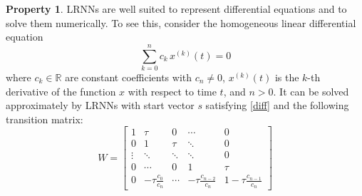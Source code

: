 \documentclass{sn-jnl}
\theoremstyle{definition}
\newtheorem{exmp}{Example}
\newtheorem{prop}{Property}
\begin{document}
\begin{prop}\label{rem}
LRNNs are well suited to represent differential equations and to solve them
numerically. To see this, consider the homogeneous linear differential equation
\begin{equation}
	\sum_{k=0}^n c_k\,x^{(k)}(t) = 0 \label{diff}
\end{equation}
where $c_k \in \mathbb{R}$ are constant coefficients with $c_n \neq 0$,
$x^{(k)}(t)$ is the $k$-th derivative of the function $x$ with respect to time
$t$, and $n>0$. It can be solved approximately by LRNNs with start vector $s$
satisfying \cref{diff} and the following transition matrix:
\begin{equation} \label{mat}
  W = \left[ \begin{array}{*{5}{c}}
	1 & \tau & 0 & \cdots & 0\\
	0 & 1 & \tau & \ddots & 0\\
	\vdots & \ddots & \ddots & \ddots & 0\\
	0 & \cdots & 0 & 1 & \tau\\
	0 & -\tau \frac{c_0}{c_n} & \cdots & -\tau \frac{c_{n-2}}{c_n} & 1\!-\!\tau \frac{c_{n-1}}{c_n}
      \end{array} \right]
\end{equation}
\end{prop}


\end{document}
